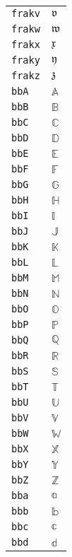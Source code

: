 \begin{longtable}{ll}
\texttt{frakv}&${}{\mathfrak{v}} {}$\\
\texttt{frakw}&${}{\mathfrak{w}} {}$\\
\texttt{frakx}&${}{\mathfrak{x}} {}$\\
\texttt{fraky}&${}{\mathfrak{y}} {}$\\
\texttt{frakz}&${}{\mathfrak{z}} {}$\\
\texttt{bbA}&${}{\mathbb{A}}{}$\\
\texttt{bbB}&${}{\mathbb{B}}{}$\\
\texttt{bbC}&${}{\mathbb{C}}{}$\\
\texttt{bbD}&${}{\mathbb{D}}{}$\\
\texttt{bbE}&${}{\mathbb{E}}{}$\\
\texttt{bbF}&${}{\mathbb{F}}{}$\\
\texttt{bbG}&${}{\mathbb{G}}{}$\\
\texttt{bbH}&${}{\mathbb{H}}{}$\\
\texttt{bbI}&${}{\mathbb{I}}{}$\\
\texttt{bbJ}&${}{\mathbb{J}}{}$\\
\texttt{bbK}&${}{\mathbb{K}}{}$\\
\texttt{bbL}&${}{\mathbb{L}}{}$\\
\texttt{bbM}&${}{\mathbb{M}}{}$\\
\texttt{bbN}&${}{\mathbb{N}}{}$\\
\texttt{bbO}&${}{\mathbb{O}}{}$\\
\texttt{bbP}&${}{\mathbb{P}}{}$\\
\texttt{bbQ}&${}{\mathbb{Q}}{}$\\
\texttt{bbR}&${}{\mathbb{R}}{}$\\
\texttt{bbS}&${}{\mathbb{S}}{}$\\
\texttt{bbT}&${}{\mathbb{T}}{}$\\
\texttt{bbU}&${}{\mathbb{U}}{}$\\
\texttt{bbV}&${}{\mathbb{V}}{}$\\
\texttt{bbW}&${}{\mathbb{W}}{}$\\
\texttt{bbX}&${}{\mathbb{X}}{}$\\
\texttt{bbY}&${}{\mathbb{Y}}{}$\\
\texttt{bbZ}&${}{\mathbb{Z}}{}$\\
\texttt{bba}&${}{\mathbb{a}}{}$\\
\texttt{bbb}&${}{\mathbb{b}}{}$\\
\texttt{bbc}&${}{\mathbb{c}}{}$\\
\texttt{bbd}&${}{\mathbb{d}}{}$\\

\end{longtable}
